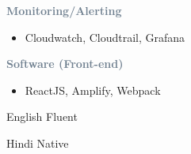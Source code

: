 \textcolor{SlateGrey}{\textbf{Monitoring/Alerting}}
\newline

\begin{itemize}
    \item Cloudwatch, Cloudtrail, Grafana
\end{itemize}

\textcolor{SlateGrey}{\textbf{Software (Front-end)}}
\newline

\begin{itemize}
    \item ReactJS, Amplify, Webpack
\end{itemize}




    English \hfill Fluent

\divider

Hindi \hfill Native




